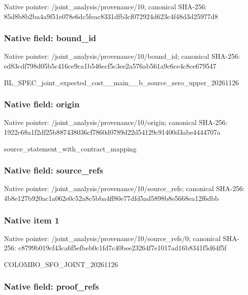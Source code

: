 \documentclass[10pt,a4paper]{article}
\begin{document}
Native pointer: /joint\_analysis/provenance/10; canonical SHA-256: 85d8b8b2ba4a9f51e078e6dc\allowbreak{}5feac8331dfb3cf072924d62\allowbreak{}3c4f48d3d25977d8



\subsubsection{Native field: bound\_id}


Native pointer: /joint\_analysis/provenance/10/bound\_id; canonical SHA-256: ed83cdf798d05b5c416ce9ca\allowbreak{}1b546ecf5c3ee2a576ab561a\allowbreak{}9c6ce4c8ce679547


BL\_SPEC\_joint\_expected\_c\allowbreak{}ost\_\_main\_\_b\_source\_zero\allowbreak{}\_upper\_20261126


\subsubsection{Native field: origin}


Native pointer: /joint\_analysis/provenance/10/origin; canonical SHA-256: 1922c68a1f2df25b88743803\allowbreak{}6cf7860d0789d22d54129c91\allowbreak{}400d3abe4444707a


source\_statement\_with\_contract\_mapping


\subsubsection{Native field: source\_refs}


Native pointer: /joint\_analysis/provenan\allowbreak{}ce/10/source\_refs; canonical SHA-256: 4b8e127b920ac1a062e0c52a\allowbreak{}8c5bba4ff80e77dfd5ad5898\allowbreak{}b8e5668ea12f6dbb



\subsubsection{Native item 1}


Native pointer: /joint\_analysis/provenan\allowbreak{}ce/10/source\_refs/0; canonical SHA-256: c8799b019cf43ca6f5efbeb0\allowbreak{}c1fd7c40bee23264f7e1017a\allowbreak{}d16b8341f5d64f5f


COLOMBO\_SFO\_JOINT\_20261126


\subsubsection{Native field: proof\_refs}
\end{document}
